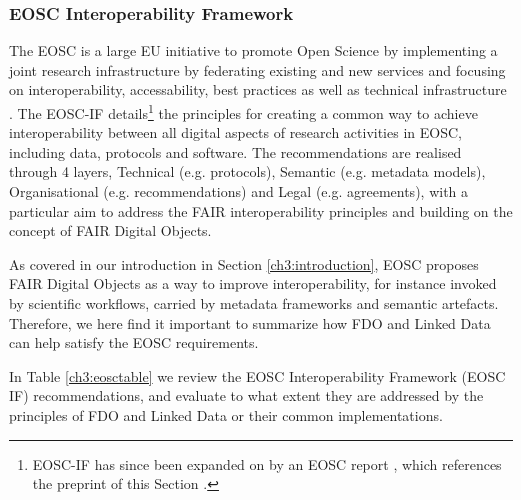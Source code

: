 \subsubsection{EOSC Interoperability Framework}\label{ch3:eosc-interoperability-framework}

The \acrfull{EOSC}
is a large EU initiative to promote Open Science by implementing a joint research infrastructure by federating existing and new services and focusing on interoperability, accessability, best practices as well as technical infrastructure \cite{Ayris 2016}. The 
\acrfull{EOSC-IF}
\cite{Kurowski 2021} details\footnote{
  \acrshort{EOSC-IF} has since been expanded on by an EOSC report \cite{Åkerström 2024}, which references the preprint of this Section \cite{Soiland-Reyes 2024b}.
}
the principles for creating a common way to achieve interoperability between all digital aspects of research activities in EOSC, including data, protocols and software. The recommendations are realised through 4 layers, Technical (e.g. protocols), Semantic (e.g. metadata models), Organisational (e.g. recommendations) and Legal (e.g. agreements), with a particular aim to address the FAIR interoperability principles and building on the concept of FAIR Digital Objects. 

As covered in our introduction in Section \vref{ch3:introduction}, EOSC proposes FAIR Digital Objects as a way to improve interoperability, for instance invoked by \glspl{scientific workflow}, carried by metadata frameworks and semantic artefacts. Therefore, we here find it important to summarize how FDO and Linked Data can help satisfy the EOSC requirements.

In Table \vref{ch3:eosctable} we review the EOSC Interoperability Framework (EOSC IF) recommendations, and evaluate to what extent they are addressed by the principles of FDO and Linked Data or their common implementations.

